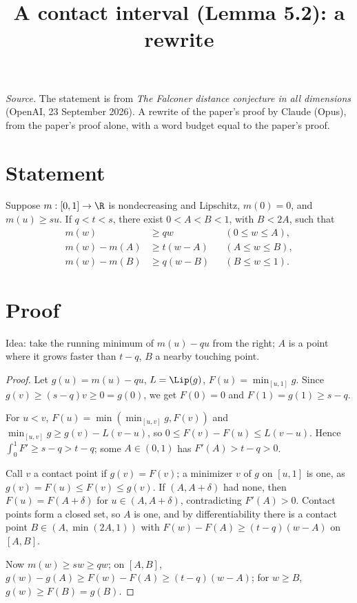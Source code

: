 \documentclass[11pt,reqno]{amsart}
\title{A contact interval (Lemma 5.2): a rewrite}
\begin{document}
\maketitle
\noindent\emph{Source.} The statement is from \emph{The Falconer distance conjecture in all dimensions} (OpenAI, 23 September 2026). A rewrite of the paper's proof by Claude (Opus), from the paper's proof alone, with a word budget equal to the paper's proof.

\section*{Statement}
\begin{lemma}\label{prep:contact}
Suppose $m:[0,1]\to\R$ is nondecreasing and Lipschitz,
$m(0)=0$, and $m(u)\ge su$. If $q<t<s$, there exist
$0<A<B<1$, with $B<2A$, such that
\begin{align}
 m(w)&\ge qw &&(0\le w\le A),\label{prep:contact-first}\\
 m(w)-m(A)&\ge t(w-A)&&(A\le w\le B),\label{prep:contact-middle}\\
 m(w)-m(B)&\ge q(w-B)&&(B\le w\le1).\label{prep:contact-last}
\end{align}
\end{lemma}

\section*{Proof}
Idea: take the running minimum of $m(u)-qu$ from the right; $A$ is a point where it grows faster than $t-q$, $B$ a nearby touching point.

\begin{proof}
Let $g(u)=m(u)-qu$, $L=\Lip(g)$, $F(u)=\min_{[u,1]}g$. Since $g(v)\ge(s-q)v\ge0=g(0)$, we get $F(0)=0$ and $F(1)=g(1)\ge s-q$.

For $u<v$, $F(u)=\min(\min_{[u,v]}g,F(v))$ and $\min_{[u,v]}g\ge g(v)-L(v-u)$, so $0\le F(v)-F(u)\le L(v-u)$. Hence $\int_0^1F'\ge s-q>t-q$; some $A\in(0,1)$ has $F'(A)>t-q>0$.

Call $v$ a contact point if $g(v)=F(v)$; a minimizer $v$ of $g$ on $[u,1]$ is one, as $g(v)=F(u)\le F(v)\le g(v)$. If $(A,A+\delta)$ had none, then $F(u)=F(A+\delta)$ for $u\in(A,A+\delta)$, contradicting $F'(A)>0$. Contact points form a closed set, so $A$ is one, and by differentiability there is a contact point $B\in(A,\min(2A,1))$ with $F(w)-F(A)\ge(t-q)(w-A)$ on $[A,B]$.

Now $m(w)\ge sw\ge qw$; on $[A,B]$, $g(w)-g(A)\ge F(w)-F(A)\ge(t-q)(w-A)$; for $w\ge B$, $g(w)\ge F(B)=g(B)$.
\end{proof}
\end{document}
